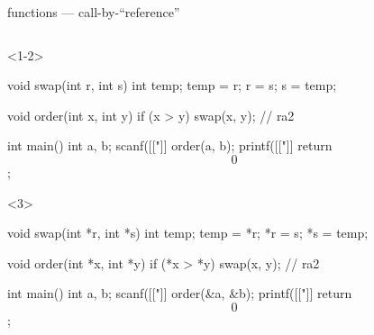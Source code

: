 \documentclass[10pt,t,svgnames]{beamer}
\begin{document}
  \begin{frame}[fragile]{functions --- call-by-``reference''}
    \begin{columns}
      \begin{column}{.6\textwidth}
        \vspace{-20em} %
        \begin{scriptsize}
          \begin{onlyenv}<1-2>
            \begin{codeblock}[firstnumber=5, gobble=8]
              void swap(int r, int s) {
                int temp;
                temp = r;
                r = s;
                s = temp;
              }

              void order(int x, int y) {
                if (x > y) {
                  swap(x, y);
                } // ra2
              }

              int main() {
                int a, b;
                scanf([["]]%
                order(a, b);
                printf([["]]%
                return $$0$$;
              }
            \end{codeblock}
          \end{onlyenv}
          \begin{onlyenv}<3>
            \begin{codeblock}[firstnumber=5, gobble=8]
              void swap(int *r, int *s) {
                int temp;
                temp = *r;
                *r = s;
                *s = temp;
              }

              void order(int *x, int *y) {
                if (*x > *y) {
                  swap(x, y);
                } // ra2
              }

              int main() {
                int a, b;
                scanf([["]]%
                order(&a, &b);
                printf([["]]%
                return $$0$$;
              }
            \end{codeblock}
          \end{onlyenv}
        \end{scriptsize}
      \end{column}


\end{columns}
\end{frame}
\end{document}
